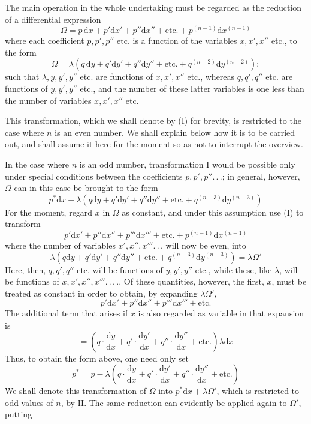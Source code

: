 The main operation in the whole undertaking must be regarded as the reduction of a differential expression
\[
\Omega=p\,\mathrm dx+p'\mathrm dx'+p''\mathrm dx''+\text{etc.}+p^{(n-1)}\mathrm dx^{(n-1)}
\]
where each coefficient $p,p',p''$ etc. is a function of the variables $x,x',x''$ etc., to the form
\[
\Omega=\lambda(q\,\mathrm dy+q'\mathrm dy'+q''\mathrm dy''+\text{etc.}+q^{(n-2)}\mathrm dy^{(n-2)});
\]
such that $\lambda,y,y',y''$ etc. are functions of $x,x',x''$ etc., whereas $q,q',q''$ etc. are functions of $y,y',y''$ etc., and the number of these latter variables is one less than the number of variables $x,x',x''$ etc.

This transformation, which we shall denote by (I) for brevity, is restricted to the case where $n$ is an even number. We shall explain below%
 how it is to be carried out, and shall assume it here for the moment so as not to interrupt the overview.
\par
In the case where $n$ is an odd number, transformation I would be possible only under special conditions between the coefficients $p,p',p''.\,.\,.$; in general, however, $\Omega$ can in this case be brought to the form
\[
p^{*}\mathrm{d}x+\lambda(q\mathrm{d}y+q'\mathrm{d}y'+q''\mathrm{d}y''+\mathrm{etc.}
+q^{(n-3)}\mathrm{d}y^{(n-3)})
\]
For the moment, regard $x$ in $\Omega$ as constant, and under this assumption use (I) to transform
\[
p'\mathrm{d}x'+p''\mathrm{d}x''+p'''\mathrm{d}x'''+\mathrm{etc.}
+p^{(n-1)}\mathrm{d}x^{(n-1)}
\]
where the number of variables $x',x'',x'''.\,.\,.$ will now be even, into
\[
\lambda(q\mathrm{d}y+q'\mathrm{d}y'+q''\mathrm{d}y''+\mathrm{etc.}
+q^{(n-3)}\mathrm{d}y^{(n-3)})=\lambda\Omega'
\]
Here, then, $q,q',q''$ etc. will be functions of $y,y',y''$ etc., while these, like $\lambda$, will be functions of $x,x',x'',x'''.\,.\,.\,.$. Of these quantities, however, the first, $x$, must be treated as constant in order to obtain, by expanding $\lambda\Omega'$,
\[
p'\mathrm{d}x'+p''\mathrm{d}x''+p'''\mathrm{d}x'''+\mathrm{etc.}
\]
The additional term that arises if $x$ is also regarded as variable in that expansion is
\[
=(q\cdot\frac{\mathrm{d}y}{\mathrm{d}x}
+q'\cdot\frac{\mathrm{d}y'}{\mathrm{d}x}
+q''\cdot\frac{\mathrm{d}y''}{\mathrm{d}x}+\mathrm{etc.})\lambda\mathrm{d}x
\]
Thus, to obtain the form above, one need only set
\[
p^{*}=p-\lambda(q\cdot\frac{\mathrm{d}y}{\mathrm{d}x}
+q'\cdot\frac{\mathrm{d}y'}{\mathrm{d}x}
+q''\cdot\frac{\mathrm{d}y''}{\mathrm{d}x}+\mathrm{etc.})
\]
We shall denote this transformation of $\Omega$ into $p^{*}\mathrm{d}x+\lambda\Omega'$, which is restricted to odd values of $n$, by II. The same reduction can evidently be applied again to $\Omega'$, putting
